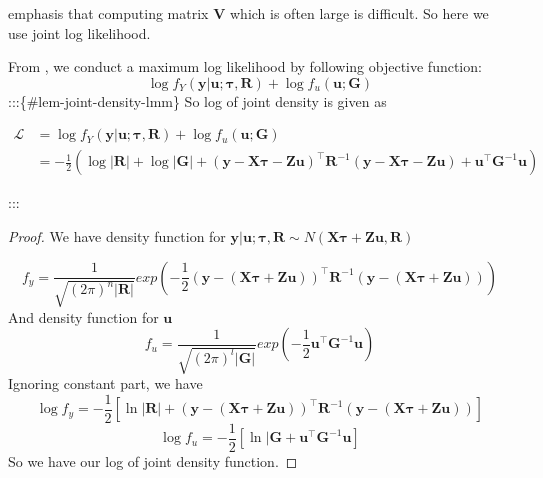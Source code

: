 \documentclass[
  a4paper,
  oneside,
  openany,
  12pt,
  onecolumn]{book}
\theoremstyle{definition}
\theoremstyle{plain}
\theoremstyle{remark}
\begin{document}
\citet{henderson1959estimation} emphasis that computing matrix
\(\boldsymbol{V}\) which is often large is difficult. So here we use
joint log likelihood.

From \citet{butler2013optimal}, we conduct a maximum log likelihood by
following objective function: \[
\log f_Y(\boldsymbol{y}|\boldsymbol{u};\boldsymbol{\tau},\boldsymbol{R})+\log f_u(\boldsymbol{u};\boldsymbol{G})
\] :::\{\#lem-joint-density-lmm\} So log of joint density is given as

\[\begin{aligned}
\mathcal{L}&=\log f_Y(\boldsymbol{y}|\boldsymbol{u};\boldsymbol{\tau},\boldsymbol{R})+\log f_u(\boldsymbol{u};\boldsymbol{G})\\
&=-\frac{1}{2}\left(\log|\boldsymbol{R}|+\log|\boldsymbol{G}|+(\boldsymbol{y}-\boldsymbol{X}\boldsymbol{\tau}-\boldsymbol{Z}\boldsymbol{u})^\top \mathbf{R}^{-1}(\boldsymbol{y}-\boldsymbol{X}\boldsymbol{\tau}-\boldsymbol{Z}\boldsymbol{u})+\boldsymbol{u}^\top\boldsymbol{G}^{-1}\boldsymbol{u}\right)
\end{aligned}\]

:::

\begin{proof}
We have density function for
\(\boldsymbol{y}|\boldsymbol{u};\boldsymbol{\tau},\boldsymbol{R}\sim N(\boldsymbol{X}\boldsymbol{\tau}+\boldsymbol{Z}\boldsymbol{u},\boldsymbol{R})\)

\[
f_y = \frac{1}{\sqrt{(2\pi)^{n}|\boldsymbol{R}|}}exp(-\frac{1}{2}(\boldsymbol{y}-(\boldsymbol{X}\boldsymbol{\tau}+\boldsymbol{Z}\boldsymbol{u}))^\top\boldsymbol{R}^{-1}(\boldsymbol{y}-(\boldsymbol{X}\boldsymbol{\tau}+\boldsymbol{Z}\boldsymbol{u})))
\] And density function for \(\boldsymbol{u}\) \[
f_u = \frac{1}{\sqrt{(2\pi)^{l}|\boldsymbol{G}|}}exp(-\frac{1}{2}\boldsymbol{u}^\top\boldsymbol{G}^{-1}\boldsymbol{u})
\] Ignoring constant part, we have \[
\log f_y=-\frac{1}{2}[\ln |\boldsymbol{R}|+(\boldsymbol{y}-(\boldsymbol{X}\boldsymbol{\tau}+\boldsymbol{Z}\boldsymbol{u}))^\top\boldsymbol{R}^{-1}(\boldsymbol{y}-(\boldsymbol{X}\boldsymbol{\tau}+\boldsymbol{Z}\boldsymbol{u}))]
\] \[
\log f_u = -\frac{1}{2}[\ln |\boldsymbol{G}+\boldsymbol{u}^\top\boldsymbol{G}^{-1}\boldsymbol{u}]
\] So we have our log of joint density function.
\end{proof}
\end{document}
